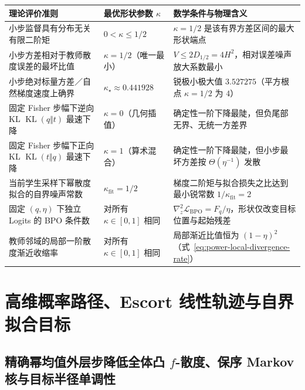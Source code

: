 \documentclass[lang=cn,scheme=chinese,openany]{elegantbook}
\newcommand{\KL}{\operatorname{KL}}
\begin{document}
\begin{center}
\small
\begin{tabular}{p{55mm}p{35mm}p{54mm}}
\toprule
理论评价准则 & 最优形状参数 $\kappa$ & 数学条件与物理含义\\
\midrule
小步监督具有分布无关有限二阶矩 & $0<\kappa\le 1/2$ & $\kappa=1/2$ 是该有界方差区间的最大形状端点\\
小步方差相对于教师散度误差的最坏比值 & $\kappa=1/2$（唯一最小） & $V\le 2D_{1/2}=4H^2$，相对误差噪声放大系数最小\\
小步绝对标量方差／自然梯度速度上确界 & $\kappa_\star\approx 0.441928$ & 锐极小极大值 $3.527275$（平方根点 $\kappa=1/2$ 为 $4$）\\
固定 Fisher 步幅下逆向 KL $\KL(q\Vert t)$ 最速下降 & $\kappa=0$（几何插值） & 确定性一阶下降最陡，但负尾部无界、无统一方差界\\
固定 Fisher 步幅下正向 KL $\KL(t\Vert q)$ 最速下降 & $\kappa=1$（算术混合） & 确定性一阶下降最陡，但小步最坏方差按 $\Theta(\eta^{-1})$ 发散\\
当前学生采样下幂散度拟合的自界噪声常数 & $\kappa_{\mathrm{fit}}=1/2$ & 梯度二阶矩与拟合损失之比达到最小锐常数 $1/\kappa_{\mathrm{fit}}=2$\\
固定 $(q,\eta)$ 下独立 Logits 的 BPO 条件数 & 对所有 $\kappa\in[0,1]$ 相同 & $\nabla_z^2\mathcal L_{\mathrm{BPO}}=F_q/\eta$，形状仅改变目标位置与起始残差\\
教师邻域的局部一阶散度渐近收缩率 & 对所有 $\kappa\in[0,1]$ 相同 & 局部渐近比值恒为 $(1-\eta)^2$（式~\eqref{eq:power-local-divergence-rate}）\\
\bottomrule
\end{tabular}
\end{center}

\section{高维概率路径、Escort 线性轨迹与自界拟合目标}
\label{sec:power-projection}

\subsection{精确幂均值外层步降低全体凸 \texorpdfstring{$f$}{f}-散度、保序 Markov 核与目标半径单调性}
\end{document}
